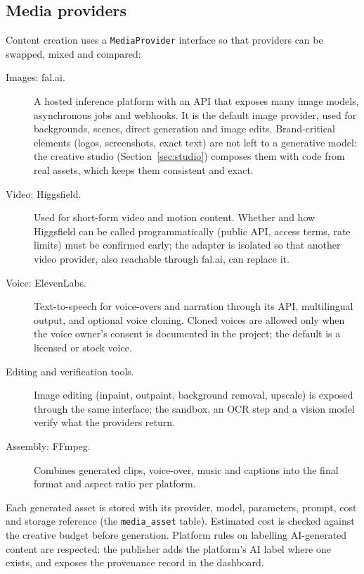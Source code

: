 \documentclass[11pt,a4paper]{article}
\begin{document}
\subsection{Media providers}
Content creation uses a \texttt{MediaProvider} interface so that providers can be swapped, mixed and compared:

\begin{description}
  \item[Images: fal.ai.] A hosted inference platform with an API that exposes many image models, asynchronous jobs and webhooks. It is the default image provider, used for backgrounds, scenes, direct generation and image edits. Brand-critical elements (logos, screenshots, exact text) are not left to a generative model: the creative studio (Section~\ref{sec:studio}) composes them with code from real assets, which keeps them consistent and exact.
  \item[Video: Higgsfield.] Used for short-form video and motion content. Whether and how Higgsfield can be called programmatically (public API, access terms, rate limits) must be confirmed early; the adapter is isolated so that another video provider, also reachable through fal.ai, can replace it.
  \item[Voice: ElevenLabs.] Text-to-speech for voice-overs and narration through its API, multilingual output, and optional voice cloning. Cloned voices are allowed only when the voice owner's consent is documented in the project; the default is a licensed or stock voice.
  \item[Editing and verification tools.] Image editing (inpaint, outpaint, background removal, upscale) is exposed through the same interface; the sandbox, an OCR step and a vision model verify what the providers return.
  \item[Assembly: FFmpeg.] Combines generated clips, voice-over, music and captions into the final format and aspect ratio per platform.
\end{description}

Each generated asset is stored with its provider, model, parameters, prompt, cost and storage reference (the \texttt{media\_asset} table). Estimated cost is checked against the creative budget before generation. Platform rules on labelling AI-generated content are respected: the publisher adds the platform's AI label where one exists, and exposes the provenance record in the dashboard.
\end{document}
